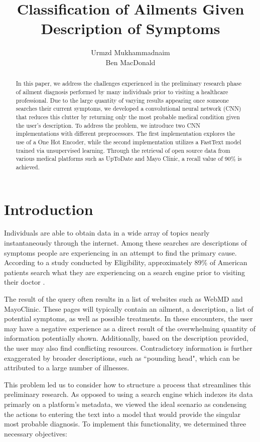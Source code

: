 \documentclass[12pt]{report}
\title{Classification of Ailments Given Description of Symptoms}
\author{Urmzd Mukhammadnaim \\ Ben MacDonald}
\begin{document}
\maketitle
\listoffigures
\tableofcontents
\begin{abstract}
	In this paper, we address the challenges experienced in the preliminary research phase
	of ailment diagnosis performed by many individuals prior to visiting a
	healthcare professional. Due to the large quantity of varying results appearing
	once someone searches their current symptoms, we developed a convolutional
	neural network (CNN) that reduces this clutter by returning only the most
	probable medical condition given the user's description.
	To address the problem, we introduce two CNN implementations with different
	preprocessors. The first implementation explores the use of a One Hot Encoder,
	while the second implementation utilizes a FastText model trained via
	unsupervised learning. Through the retrieval of open source data from various medical platforms such
	as UpToDate and Mayo Clinic, a recall value of 90\% is achieved.
\end{abstract}

\chapter{Introduction}
Individuals are able to obtain data in a wide array of topics nearly
instantaneously through the internet. Among these searches are descriptions of
symptoms people are experiencing in an attempt to find the primary cause.
According to a study conducted by Eligibility, approximately 89\% of American
patients search what they are experiencing on a search engine prior to visiting
their doctor \cite{guarino_2019}.

The result of the query often results in a list of websites such as WebMD and
MayoClinic. These pages will typically contain an ailment, a description,
a list of potential symptoms, as well as possible treatments. In these
encounters, the user may have a negative experience as a direct result of
the overwhelming quantity of information potentially shown. Additionally,
based on the description provided, the user may also find conflicting resources.
Contradictory information is further exaggerated by broader descriptions,
such as ``pounding head", which can be attributed to a large number of illnesses.

This problem led us to consider how to structure a process that streamlines this
preliminary research. As opposed to using a search engine which indexes its data primarly
on a platform's metadata, we viewed the ideal scenario as condensing the actions
to entering the text into a model that would provide the singular most probable
diagnosis. To implement this functionality, we determined three necessary
objectives:
\end{document}
